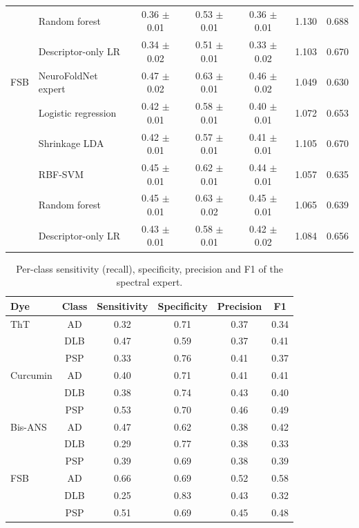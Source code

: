 \begin{table}[!htbp]
\begin{tabular}{llccccc}
 & Random forest & 0.36 $\pm$ 0.01 & 0.53 $\pm$ 0.01 & 0.36 $\pm$ 0.01 & 1.130 & 0.688 \\
 & Descriptor-only LR & 0.34 $\pm$ 0.02 & 0.51 $\pm$ 0.01 & 0.33 $\pm$ 0.02 & 1.103 & 0.670 \\
FSB & NeuroFoldNet expert & 0.47 $\pm$ 0.02 & 0.63 $\pm$ 0.01 & 0.46 $\pm$ 0.02 & 1.049 & 0.630 \\
 & Logistic regression & 0.42 $\pm$ 0.01 & 0.58 $\pm$ 0.01 & 0.40 $\pm$ 0.01 & 1.072 & 0.653 \\
 & Shrinkage LDA & 0.42 $\pm$ 0.01 & 0.57 $\pm$ 0.01 & 0.41 $\pm$ 0.01 & 1.105 & 0.670 \\
 & RBF-SVM & 0.45 $\pm$ 0.01 & 0.62 $\pm$ 0.01 & 0.44 $\pm$ 0.01 & 1.057 & 0.635 \\
 & Random forest & 0.45 $\pm$ 0.01 & 0.63 $\pm$ 0.02 & 0.45 $\pm$ 0.01 & 1.065 & 0.639 \\
 & Descriptor-only LR & 0.43 $\pm$ 0.01 & 0.58 $\pm$ 0.01 & 0.42 $\pm$ 0.02 & 1.084 & 0.656 \\
\bottomrule
\end{tabular}
\end{table}

\begin{table}[!htbp]
\centering\scriptsize
\caption{Per-class sensitivity (recall), specificity, precision and F1 of the spectral expert.}\label{tab:s_spectra_perclass}
\begin{tabular}{lccccc}
\toprule
\textbf{Dye} & \textbf{Class} & \textbf{Sensitivity} & \textbf{Specificity} & \textbf{Precision} & \textbf{F1} \\
\midrule
ThT & AD & 0.32 & 0.71 & 0.37 & 0.34 \\
 & DLB & 0.47 & 0.59 & 0.37 & 0.41 \\
 & PSP & 0.33 & 0.76 & 0.41 & 0.37 \\
Curcumin & AD & 0.40 & 0.71 & 0.41 & 0.41 \\
 & DLB & 0.38 & 0.74 & 0.43 & 0.40 \\
 & PSP & 0.53 & 0.70 & 0.46 & 0.49 \\
Bis-ANS & AD & 0.47 & 0.62 & 0.38 & 0.42 \\
 & DLB & 0.29 & 0.77 & 0.38 & 0.33 \\
 & PSP & 0.39 & 0.69 & 0.38 & 0.39 \\
FSB & AD & 0.66 & 0.69 & 0.52 & 0.58 \\
 & DLB & 0.25 & 0.83 & 0.43 & 0.32 \\
 & PSP & 0.51 & 0.69 & 0.45 & 0.48 \\
\bottomrule
\end{tabular}
\end{table}

